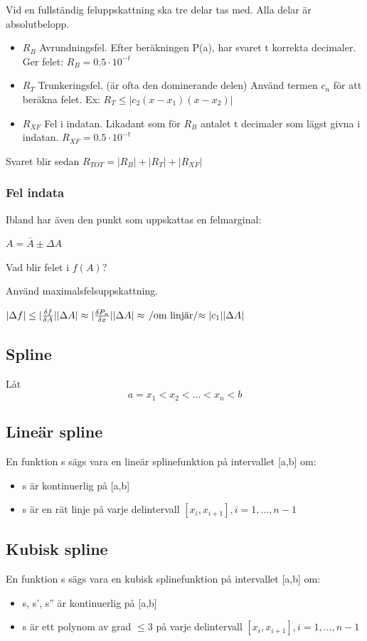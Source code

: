 \documentclass[12pt,a4paper]{article}
\begin{document}
Vid en fullständig feluppskattning ska tre delar tas med.
Alla delar är absolutbelopp.

\begin{itemize}
\item{$R_B$ Avrundningsfel.
Efter beräkningen P(a), har svaret t korrekta decimaler. \\Ger felet: $ R_B = 0.5 \cdot 10^{-t}$}
\item{$R_T$ Trunkeringsfel.
(är ofta den dominerande delen)
Använd termen $c_n$ för att beräkna felet.
Ex: $ R_T \leq |c_2 (x-x_1)(x-x_2)|$
}
\item{$R_{XF}$ Fel i indatan.
Likadant som för $R_B$ antalet t decimaler som lägst givna i indatan.
$R_{XF} = 0.5 \cdot 10^{-t}$}
\end{itemize}

Svaret blir sedan $R_{TOT} = | R_B | + | R_T | + |R_{XF}| $

\subsubsection{Fel indata}
Ibland har även den punkt som uppskattas en felmarginal:

$A = \bar{A} \pm \Delta A $

Vad blir felet i $f(A)$?

Använd maximalsfelsuppskattning.

$|\Delta f| \leq |\frac{\delta f}{\delta A}| |\Delta A| \approx |\frac{\delta P_n}{\delta x}| |\Delta A| \approx \left. \middle/ \text{om linjär} \middle/ \approx \right. |c_1||\Delta A|$


\subsection{Spline}
Låt
$$ a = x_1 < x_2 < \ldots < x_n < b $$

\subsection{Lineär spline}
En funktion s sägs vara en lineär splinefunktion på intervallet [a,b] om:
\begin{itemize}
\item{s är kontinuerlig på [a,b]}
\item{s är en rät linje på varje delintervall $[x_i,x_{i+1}], i = 1,\ldots,n-1 $}
\end{itemize}

\subsection{Kubisk spline}
En funktion s sägs vara en kubisk splinefunktion på intervallet [a,b] om:
\begin{itemize}
\item{s, s', s'' är kontinuerlig på [a,b]}
\item{s är ett polynom av grad $\leq 3$ på varje delintervall $[x_i,x_{i+1}], i = 1,\ldots,n-1 $}
\end{itemize}
\end{document}
